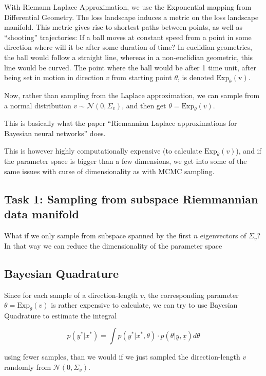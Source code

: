 \documentclass{article}
\begin{document}
With Riemann Laplace Approximation, we use the Exponential mapping from Differential Geometry. The loss landscape induces a metric on the loss landscape manifold. This metric gives rise to shortest paths between points, as well as “shooting” trajectories: If a ball moves at constant speed from a point in some direction where will it be after some duration of time? In euclidian geometrics, the ball would follow a straight line, whereas in a non-euclidian geometric, this line would be curved. The point where the ball would be after 1 time unit, after being set in motion in direction $v$ from starting point $\theta$, is denoted $\mathrm{Exp_\theta(v)}$.

Now, rather than sampling from the Laplace approximation, we can sample from a normal distribution $v \sim \mathcal N(0, \Sigma_v)$, and then get $\theta = \mathrm{Exp}_\theta(v)$. 

This is basically what the paper “Riemannian Laplace approximations for Bayesian neural networks” does.

This is however highly computationally expensive (to calculate $\mathrm{Exp}_\theta(v)$), and if the parameter space is bigger than a few dimensions, we get into some of the same issues with curse of dimensionality as with MCMC sampling.

\subsection*{Task 1: Sampling from subspace Riemmannian data manifold}

What if we only sample from subspace spanned by the first $n$ eigenvectors of $\Sigma_v$? In that way we can reduce the dimensionality of the parameter space

\subsection*{Bayesian Quadrature}

Since for each sample of a direction-length $v$, the corresponding parameter $\theta = \mathrm{Exp}_\theta(v)$ is rather expensive to calculate, we can try to use Bayesian Quadrature to estimate the integral

$$
p(y^\ast\vert x^\ast) = \int p(y^\ast\vert x^\ast, \theta)\cdot p(\theta\vert \underline y, \underline x)d\theta
$$

using fewer samples, than we would if we just sampled the direction-length $v$ randomly from  $\mathcal N(0, \Sigma_v)$.
\end{document}
